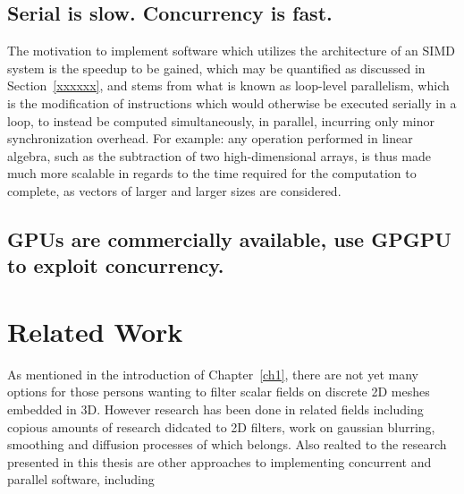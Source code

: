 %
\subsection{Serial is slow. Concurrency is fast.}
The motivation to implement software which utilizes the architecture of an SIMD system is the speedup to be gained, which may be quantified as discussed in Section~\ref{xxxxxx}, and stems from what is known as loop-level parallelism, which is the modification of instructions which would otherwise be executed serially in a loop, to instead be computed simultaneously, in parallel, incurring only minor synchronization overhead. For example: any operation performed in linear algebra, such as the subtraction of two high-dimensional arrays, is thus made much more scalable in regards to the time required for the computation to complete, as vectors of larger and larger sizes are considered.

%
\subsection{GPUs are commercially available, use GPGPU to exploit concurrency.}

%
%
%
%
%
%
\section{Related Work}
As mentioned in the introduction of Chapter~\ref{ch1}, there are not yet many options for those persons wanting to filter scalar fields on discrete 2D meshes embedded in 3D. However research has been done in related fields including copious amounts of research didcated to 2D filters, work on gaussian blurring, smoothing and diffusion processes of which  belongs. Also realted to the research presented in this thesis are other approaches to implementing concurrent and parallel software, including

